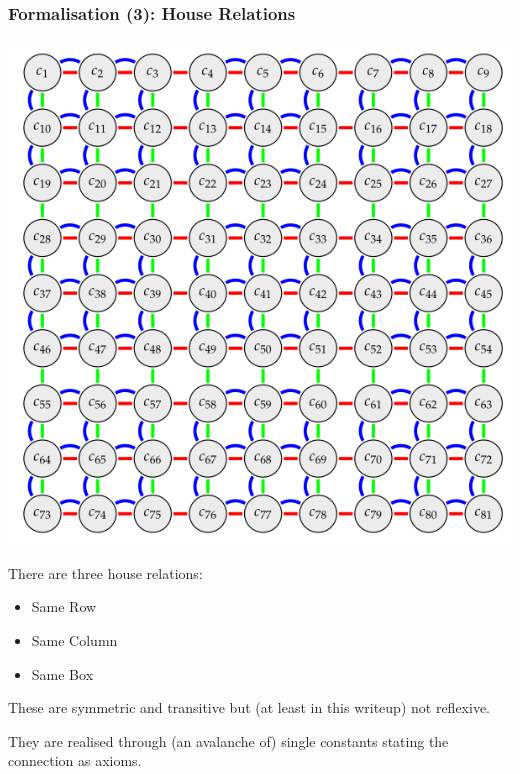 \documentclass[aspectratio=169, usenames, dvipsnames]{beamer}
\begin{document}
\begin{frame}
\frametitle{Formalisation (3): House Relations}
\begin{minipage}{0.52\textwidth}
\begin{center}
\includegraphics[height=0.75\textheight,keepaspectratio]{images/house_relations.png} 
\end{center}
\end{minipage}\begin{minipage}{0.41\textwidth}
There are three house relations:
\begin{itemize}
\item Same Row
\item Same Column
\item Same Box
\end{itemize}
\bigskip

These are symmetric and transitive but (at least in this writeup) not reflexive.
\medskip

They are realised through (an avalanche of) single constants stating the connection as axioms.
\end{minipage}

\end{frame}
\end{document}
